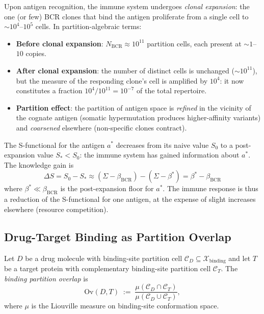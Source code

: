 \begin{example}
\label{ex:ch02-clonal-expansion}
Upon antigen recognition, the immune system undergoes \emph{clonal expansion}:
the one (or few) BCR clones that bind the antigen proliferate from a single
cell to $\sim 10^4$--$10^5$ cells.  In partition-algebraic terms:

\begin{itemize}
  \item \textbf{Before clonal expansion}: $N_{\mathrm{BCR}} \approx 10^{11}$
    partition cells, each present at $\sim 1$--$10$ copies.
  \item \textbf{After clonal expansion}: the number of distinct cells is
    unchanged ($\sim 10^{11}$), but the measure of the responding clone's
    cell is amplified by $10^4$: it now constitutes a fraction $10^4/10^{11}
    = 10^{-7}$ of the total repertoire.
  \item \textbf{Partition effect}: the partition of antigen space is
    \emph{refined} in the vicinity of the cognate antigen (somatic
    hypermutation produces higher-affinity variants) and \emph{coarsened}
    elsewhere (non-specific clones contract).
\end{itemize}

The S-functional for the antigen $a^*$ decreases from its naive value $S_0$
to a post-expansion value $S_* < S_0$: the immune system has gained
information about $a^*$.  The knowledge gain is
\[
  \Delta S = S_0 - S_*
  \approx (\Sigma - \beta_{\mathrm{BCR}}) - (\Sigma - \beta^*)
  = \beta^* - \beta_{\mathrm{BCR}}
\]
where $\beta^* \ll \beta_{\mathrm{BCR}}$ is the post-expansion floor for $a^*$.
The immune response is thus a reduction of the S-functional for one antigen,
at the expense of slight increases elsewhere (resource competition).
\end{example}

\subsection{Drug-Target Binding as Partition Overlap}

\begin{definition}
\label{def:ch02-binding-overlap}
Let $D$ be a drug molecule with binding-site partition cell $\mathcal{C}_D
\subseteq \mathcal{X}_{\mathrm{binding}}$ and let $T$ be a target protein with
complementary binding-site partition cell $\mathcal{C}_T$.  The
\emph{binding partition overlap} is
\[
  \mathrm{Ov}(D, T)
  \;:=\;
  \frac{\mu(\mathcal{C}_D \cap \mathcal{C}_T)}{\mu(\mathcal{C}_D \cup \mathcal{C}_T)},
\]
where $\mu$ is the Liouville measure on binding-site conformation space.
\end{definition}

